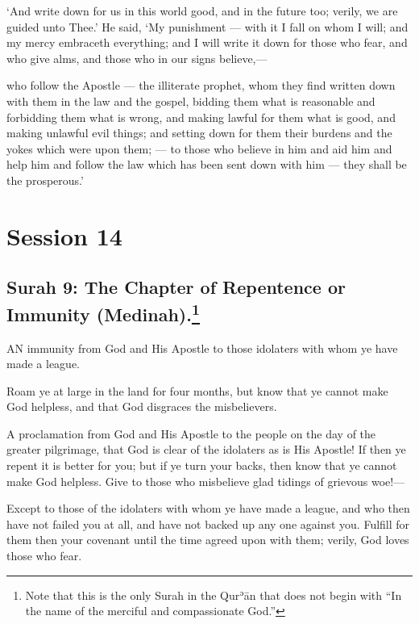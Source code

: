 \documentclass[fontsize=14pt, letterpaper, notitlepage, openany, DIV=12]{scrbook} %
\begin{document}
\noindent[7:156]
`And write down for us in this world good, and in the future too; verily, we are guided
unto Thee.' He said, `My punishment --- with it I fall on whom I will; and my mercy embraceth
everything; and I will write it down for those who fear, and who give alms, and those who in our
signs believe,---

\noindent[7:157]
who follow the Apostle --- the illiterate prophet, whom they find written down with them
in the law and the gospel, bidding them what is reasonable and forbidding them what is wrong,
and making lawful for them what is good, and making unlawful evil things; and setting down for
them their burdens and the yokes which were upon them; --- to those who believe in him and aid
him and help him and follow the law which has been sent down with him --- they shall be the
prosperous.'

\clearpage
\chapter{Session 14}


\section[Surah 9: The Chapter of Repentence or Immunity (Medinah).]{Surah 9: The Chapter of Repentence or Immunity (Medinah).\footnote{Note that this is the only Surah in the Qurʾān that does not begin with ``In the name of the merciful and compassionate God.''}}


\noindent[9:1]
AN immunity from God and His Apostle to those idolaters with whom ye have made a
league.

\noindent[9:2]
Roam ye at large in the land for four months, but know that ye cannot make God
helpless, and that God disgraces the misbelievers.

\noindent[9:3]
A proclamation from God and His Apostle to the people on the day of the greater
pilgrimage, that God is clear of the idolaters as is His Apostle! If then ye repent it is better for
you; but if ye turn your backs, then know that ye cannot make God helpless. Give to those who
misbelieve glad tidings of grievous woe!---

\noindent[9:4]
Except to those of the idolaters with whom ye have made a league, and who then have
not failed you at all, and have not backed up any one against you. Fulfill for them then your
covenant until the time agreed upon with them; verily, God loves those who fear.
\end{document}
